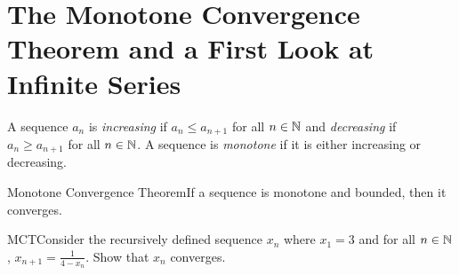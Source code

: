 \renewcommand{\theenumi}{\arabic{enumi}}
\renewcommand{\labelenumi}{\theenumi.}
\section{The Monotone Convergence Theorem and a First Look at Infinite Series}

\begin{definition}
    A sequence \(a_n\) is \textit{increasing} if \(a_n \leq a_{n+1}\) for all \(n \in \mathbb{N}\) and \textit{decreasing} if \(a_n \geq a_{n+1}\) for all \(n \in \mathbb{N}\). A sequence is \textit{monotone} if it is either increasing or decreasing.
\end{definition}

\begin{ntheorem}
    {Monotone Convergence Theorem}If a sequence is monotone and bounded, then it converges.
\end{ntheorem}


\begin{example}
    {MCT}Consider the recursively defined sequence \(x_n\) where \(x_1 = 3\) and for all \(n \in \mathbb{N}\), \(x_{n + 1} = \frac{1}{4 - x_n}\). Show that \(x_n\) converges.
\end{example}

